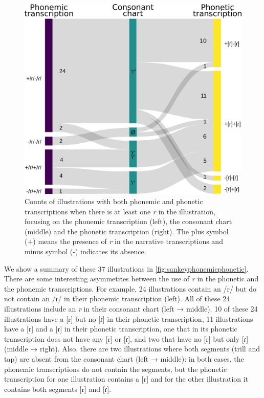 \begin{figure}
	\centering
	\includegraphics[width=0.75\linewidth]{jipa/images/sankey_phonemic_phonetic}
	\caption[Counts of illustrations with both phonemic and phonetic transcriptions when there is at least one \textit{r} in the illustration]{Counts of illustrations with both phonemic and phonetic transcriptions when there is at least one \textit{r} in the illustration, focusing on the phonemic transcription (left), the consonant chart (middle) and the phonetic transcription (right). The plus symbol (+) means the presence of \textit{r} in the narrative transcriptions and minus symbol (-) indicates its absence.}
	\label{fig:sankeyphonemicphonetic}
\end{figure}

We show a summary of these 37 illustrations in \autoref{fig:sankeyphonemicphonetic}. There are some interesting asymmetries between the use of \textit{r} in the phonetic and the phonemic transcriptions. For example, 24 illustrations contain an /r/ but do not contain an /ɾ/ in their phonemic transcription (left). All of these 24 illustrations include an \textit{r} in their consonant chart (left → middle). 10 of these 24 illustrations have a [r] but no [ɾ] in their phonetic transcription, 11 illustrations have a [r] and a [ɾ] in their phonetic transcription, one that in its phonetic transcription does not have any [r] or [ɾ], and two that have no [r] but only [ɾ] (middle → right). Also, there are two illustrations where both segments (trill and tap) are absent from the consonant chart (left → middle): in both cases, the phonemic transcriptions do not contain the segments, but the phonetic transcription for one illustration contains a [r] and for the other illustration it contains both segments [r] and [ɾ].\\

